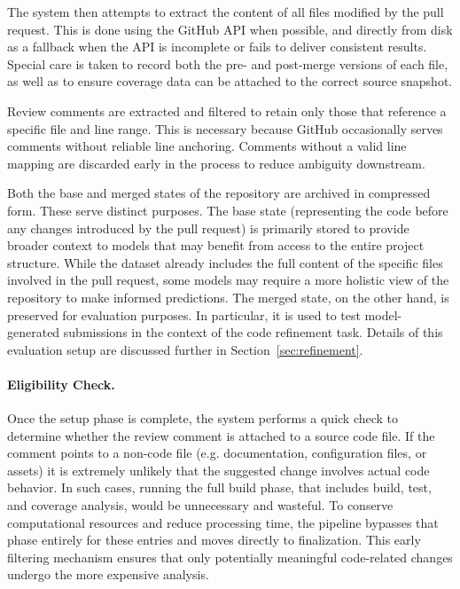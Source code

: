 The system then attempts to extract the content of all files modified by the pull request. This is
done using the GitHub API when possible, and directly from disk as a fallback when the API is
incomplete or fails to deliver consistent results. Special care is taken to record both the pre- and
post-merge versions of each file, as well as to ensure coverage data can be attached to the correct
source snapshot.

Review comments are extracted and filtered to retain only those that reference a specific file and
line range. This is necessary because GitHub occasionally serves comments without reliable line
anchoring. Comments without a valid line mapping are discarded early
in the process to reduce ambiguity downstream.

Both the base and merged states of the repository are archived in compressed form. These serve
distinct purposes. The base state (representing the code before any changes introduced by the pull
request) is primarily stored to provide broader context to models that may benefit from
access to the entire project structure. While the dataset already includes the full content of the
specific files involved in the pull request, some models may require a more holistic view of the
repository to make informed predictions. The merged state, on the other hand, is preserved for
evaluation purposes. In particular, it is used to test model-generated submissions in the context of
the code refinement task. Details of this evaluation setup are discussed further in
Section~\ref{sec:refinement}.

\paragraph{Eligibility Check.} Once the setup phase is complete, the system performs a quick check
to determine whether the review comment is attached to a source code file. If the comment points to
a non-code file (e.g. documentation, configuration files, or assets) it is extremely unlikely that
the suggested change involves actual code behavior. In such cases, running the full build phase,
that includes build, test, and coverage analysis, would be unnecessary and wasteful. To conserve
computational resources and reduce processing time, the pipeline bypasses that phase entirely for
these entries and moves directly to finalization. This early filtering mechanism ensures that only
potentially meaningful code-related changes undergo the more expensive analysis.

